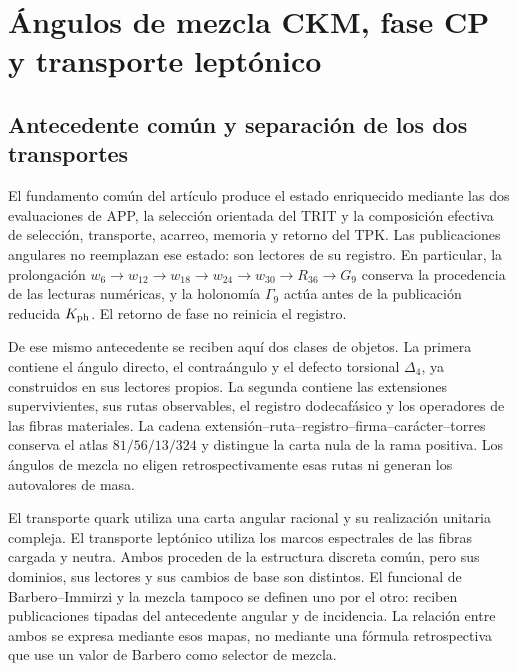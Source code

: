 
\section{Ángulos de mezcla CKM, fase CP y transporte leptónico}
\label{ii:sec:ii-propagacion-angular}

\subsection{Antecedente común y separación de los dos transportes}

El fundamento común del artículo produce el estado enriquecido mediante
las dos evaluaciones de APP, la selección orientada del TRIT y la
composición efectiva de selección, transporte, acarreo, memoria y retorno
del TPK. Las publicaciones angulares no reemplazan ese estado: son lectores
de su registro. En particular, la prolongación
\(w_6\to w_{12}\to w_{18}\to w_{24}\to w_{30}\to R_{36}\to G_9\)
conserva la procedencia de las lecturas numéricas, y la holonomía
\(\Gamma_9\) actúa antes de la publicación reducida \(K_{\rm ph}\).
El retorno de fase no reinicia el registro.

De ese mismo antecedente se reciben aquí dos clases de objetos. La primera
contiene el ángulo directo, el contraángulo y el defecto torsional
\(\Delta_4\), ya construidos en sus lectores propios. La segunda contiene
las extensiones supervivientes, sus rutas observables, el registro
dodecafásico y los operadores de las fibras materiales. La cadena
extensión--ruta--registro--firma--carácter--torres conserva el atlas
\(81/56/13/324\) y distingue la carta nula de la rama positiva.
Los ángulos de mezcla no eligen retrospectivamente esas rutas ni generan
los autovalores de masa.

El transporte quark utiliza una carta angular racional y su realización
unitaria compleja. El transporte leptónico utiliza los marcos espectrales
de las fibras cargada y neutra. Ambos proceden de la estructura discreta
común, pero sus dominios, sus lectores y sus cambios de base son distintos.
El funcional de Barbero--Immirzi y la mezcla tampoco se definen uno por el
otro: reciben publicaciones tipadas del antecedente angular y de incidencia.
La relación entre ambos se expresa mediante esos mapas, no mediante una
fórmula retrospectiva que use un valor de Barbero como selector de mezcla.

